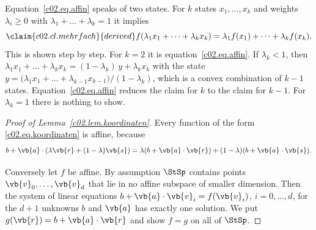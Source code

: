 \begin{vertiefung}[id=c02.v1,
    titel={Why affine functions have this form},
    wozu={The core uses Lemma~\ref{c02.lem.koordinaten} without proof. Here it is proved,
      together with the rule for mixtures of more than two states.},
    voraussetzung={Core up to Lemma~\ref{c02.lem.koordinaten}; systems of linear
      equations. The rest of the core does not need this block.},
    zurueck={On a state space in $\mathbb{R}^d$ an effect is fixed by $d+1$ numbers: $b$
      and the components of $\vb{a}$.}]
  Equation~\eqref{c02.eq.affin} speaks of two states. For $k$ states $x_1, \dots, x_k$ and
  weights $\lambda_i \geq 0$ with $\lambda_1 + \dots + \lambda_k = 1$ it implies
  \begin{equation}\label{c02.eq.mehrfach}\claim{c02.cl.mehrfach}{derived}
    f(\lambda_1 x_1 + \dots + \lambda_k x_k) = \lambda_1 f(x_1) + \dots + \lambda_k f(x_k) .
  \end{equation}
  This is shown step by step. For $k = 2$ it is equation~\eqref{c02.eq.affin}. If
  $\lambda_k < 1$, then
  $\lambda_1 x_1 + \dots + \lambda_k x_k = (1-\lambda_k)\, y + \lambda_k x_k$ with the state
  $y = \bigl(\lambda_1 x_1 + \dots + \lambda_{k-1} x_{k-1}\bigr)/(1-\lambda_k)$, which is a
  convex combination of $k-1$ states. Equation~\eqref{c02.eq.affin} reduces the claim for
  $k$ to the claim for $k-1$. For $\lambda_k = 1$ there is nothing to show.

  \begin{proof}[Proof of Lemma~\ref{c02.lem.koordinaten}]
    Every function of the form \eqref{c02.eq.koordinaten} is affine, because
    \begin{equation*}
      b + \vb{a}\cdot(\lambda\vb{r} + (1-\lambda)\vb{s})
      = \lambda(b + \vb{a}\cdot\vb{r}) + (1-\lambda)(b + \vb{a}\cdot\vb{s}) .
    \end{equation*}

    Conversely let $f$ be affine. By assumption $\StSp$ contains points
    $\vb{v}_0, \dots, \vb{v}_d$ that lie in no affine subspace of smaller dimension. Then
    the system of linear equations $b + \vb{a}\cdot\vb{v}_i = f(\vb{v}_i)$,
    $i = 0, \dots, d$, for the $d+1$ unknowns $b$ and $\vb{a}$ has exactly one solution. We
    put $g(\vb{r}) = b + \vb{a}\cdot\vb{r}$ and show $f = g$ on all of $\StSp$.


\end{proof}
\end{vertiefung}
